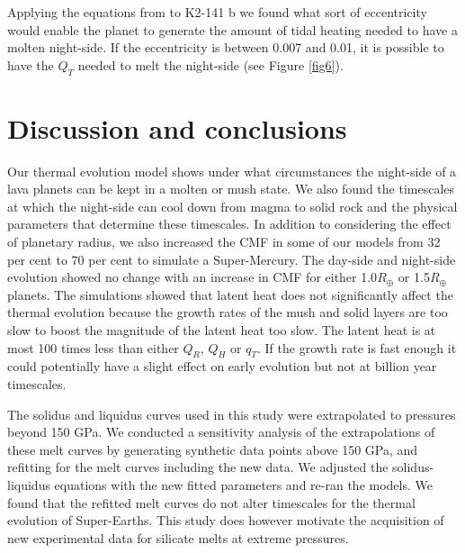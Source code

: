 \documentclass[fleqn,usenatbib]{mnras}
\begin{document}
Applying the equations from \cite{Dris2015} to K2-141 b we found what sort of eccentricity would enable the planet to generate the amount of tidal heating needed to have a molten night-side. If the eccentricity is between 0.007 and 0.01, it is possible to have the $Q_{T}$ needed to melt the night-side (see Figure \ref{fig6}). 




\section{Discussion and conclusions}    \label{sec4}

Our thermal evolution model shows under what circumstances the night-side of a lava planets can be kept in a molten or mush state. We also found the timescales at which the night-side can cool down from magma to solid rock and the physical parameters that determine these timescales. In addition to considering the effect of planetary radius, we also increased the CMF in some of our models from 32 per cent to 70 per cent to simulate a Super-Mercury. The day-side and night-side evolution showed no change with an increase in CMF for either 1.0$R_{\oplus}$ or 1.5$R_{\oplus}$ planets. The simulations showed that latent heat does not significantly affect the thermal evolution because the growth rates of the mush and solid layers are too slow to boost the magnitude of the latent heat too slow. The latent heat is at most 100 times less than either $Q_{R}$, $Q_{H}$ or $q_{T}$. If the growth rate is fast enough it could potentially have a slight effect on early evolution but not at billion year timescales. 

The solidus and liquidus curves used in this study \citep{Fiq2010, zhang1994} were extrapolated to pressures beyond 150 GPa. We conducted a sensitivity analysis of the extrapolations of these melt curves by generating synthetic data points above 150 GPa, and refitting for the melt curves including the new data. We adjusted the solidus-liquidus equations with the new fitted parameters and re-ran the models. We found that the refitted melt curves do not alter timescales for the thermal evolution of Super-Earths. This study does however motivate the acquisition of new experimental data for silicate melts at extreme pressures.   
\end{document}
